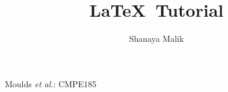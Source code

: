 \documentclass[12pt,journal,compsoc]{IEEEtran}
\begin{document}

\title{\LaTeX\ Tutorial}
\author{Shanaya Malik}

\date{}		%

%
{Moulds \MakeLowercase{\textit{et al.}}: CMPE185}
% 

\end{document}
